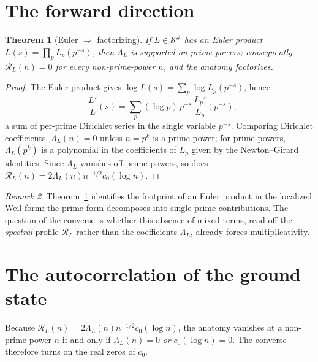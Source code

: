 \documentclass[11pt]{amsart}
\newtheorem{theorem}{Theorem}[section]
\theoremstyle{definition}
\theoremstyle{remark}
\newtheorem{remark}[theorem]{Remark}
\newcommand{\cR}{\mathcal R}
\newcommand{\cS}{\mathcal S}
\begin{document}
\section{The forward direction}\label{sec:fwd}
\begin{theorem}[Euler $\Rightarrow$ factorizing]\label{thm:fwd}
If $L\in\cS^\#$ has an Euler product $L(s)=\prod_p L_p(p^{-s})$, then $\Lambda_L$ is
supported on prime powers; consequently $\cR_L(n)=0$ for every non-prime-power
$n$, and the anatomy factorizes.
\end{theorem}
\begin{proof}
The Euler product gives $\log L(s)=\sum_p\log L_p(p^{-s})$, hence
\[
-\frac{L'}{L}(s)=\sum_p(\log p)\,p^{-s}\,\frac{L_p'}{L_p}(p^{-s}),
\]
a sum of
per-prime Dirichlet series in the single variable $p^{-s}$. Comparing Dirichlet
coefficients, $\Lambda_L(n)=0$ unless $n=p^k$ is a prime power; for prime
powers, $\Lambda_L(p^k)$ is a polynomial in the coefficients of $L_p$ given by
the Newton--Girard identities. Since $\Lambda_L$ vanishes off prime powers, so
does $\cR_L(n)=2\Lambda_L(n)n^{-1/2}c_0(\log n)$.
\end{proof}

\begin{remark}
Theorem~\ref{thm:fwd} identifies the footprint of an Euler product in the
localized Weil form: the prime form decomposes into single-prime contributions.
The question of the converse is whether this absence of mixed terms, read off
the \emph{spectral} profile $\cR_L$ rather than the coefficients $\Lambda_L$,
already forces multiplicativity.
\end{remark}

\section{The autocorrelation of the ground state}\label{sec:auto}
Because $\cR_L(n)=2\Lambda_L(n)n^{-1/2}c_0(\log n)$, the anatomy
vanishes at a non-prime-power $n$ if and only if $\Lambda_L(n)=0$ \emph{or}
$c_0(\log n)=0$. The converse therefore turns on the real zeros
of $c_0$.
\end{document}
